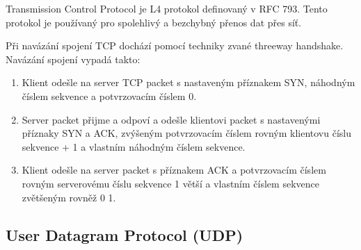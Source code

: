\documentclass[../projekt.tex]{subfiles}
\begin{document}
Transmission Control Protocol je L4 protokol definovaný v RFC 793\cite{RFC0793}. Tento protokol je používaný pro spolehlivý a bezchybný přenos dat přes síť.

Při navázání spojení TCP dochází pomocí techniky zvané threeway handshake. Navázání spojení vypadá takto:
\begin{enumerate}
    \item Klient odešle na server TCP packet s nastaveným příznakem SYN, náhodným číslem sekvence a potvrzovacím číslem 0.
    \item Server packet přijme a odpoví a odešle klientovi packet s nastavenými příznaky SYN a ACK, zvýšeným potvrzovacím číslem rovným klientovu číslu sekvence + 1 a vlastním náhodným číslem sekvence.
    \item Klient odešle na server packet s příznakem ACK a potvrzovacím číslem rovným serverovému číslu sekvence 1 větší a vlastním číslem sekvence zvětšeným rovněž 0 1.
\end{enumerate} 

\subsection{User Datagram Protocol (UDP)}
\end{document}
